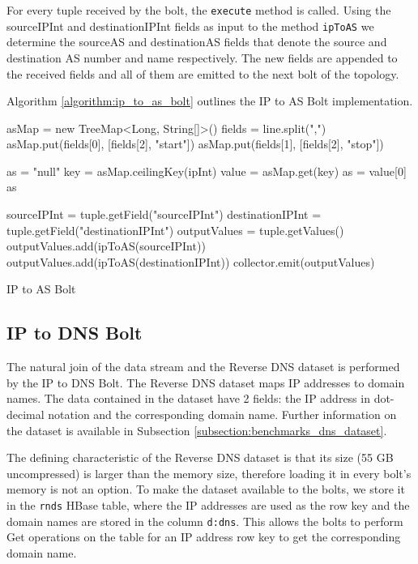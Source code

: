 For every tuple received by the bolt, the \texttt{execute} method is called.  Using the sourceIPInt and destinationIPInt fields as input to the method \texttt{ipToAS} we determine the sourceAS and destinationAS fields that denote the source and destination AS number and name respectively. The new fields are appended to the received fields and all of them are emitted to the next bolt of the topology.

Algorithm \ref{algorithm:ip_to_as_bolt} outlines the IP to AS Bolt implementation. 

\begin{algorithm}[H]
\begin{algorithmic}[1]
\State asMap = new TreeMap<Long, String[]>()
\State fields = line.split(",")
\State asMap.put(fields[0], [fields[2], "start"])
\State asMap.put(fields[1], [fields[2], "stop"])
\EndFor
\EndFunction

\State as = "null"
\State key = asMap.ceilingKey(ipInt)
\State value = asMap.get(key)
\State as = value[0]
\EndIf
\EndIf
\Return as
\EndFunction

\State sourceIPInt = tuple.getField("sourceIPInt")
\State destinationIPInt = tuple.getField("destinationIPInt")
\State outputValues = tuple.getValues()
\State outputValues.add(ipToAS(sourceIPInt))
\State outputValues.add(ipToAS(destinationIPInt))
\State collector.emit(outputValues)
\EndFunction
\end{algorithmic}
\caption{IP to AS Bolt}
\label{algorithm:ip_to_as_bolt}
\end{algorithm}

\subsection{IP to DNS Bolt}

The natural join of the data stream and the Reverse DNS dataset is performed by the IP to DNS Bolt. The Reverse DNS dataset maps IP addresses to domain names. The data contained in the dataset have 2 fields: the IP address in dot-decimal notation and the corresponding domain name. Further information on the dataset is available in Subsection \ref{subsection:benchmarks_dns_dataset}.

The defining characteristic of the Reverse DNS dataset is that its size (55 GB uncompressed) is larger than the memory size, therefore loading it in every bolt's memory is not an option. To make the dataset available to the bolts, we store it in the \texttt{rnds} HBase table, where the IP addresses are used as the row key and the domain names are stored in the column \texttt{d:dns}. This allows the bolts to perform Get operations on the table for an IP address row key to get the corresponding domain name.

